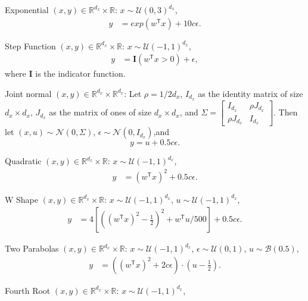 \documentclass[11pt]{article}
\newcommand{\T}{^{\ensuremath{\mathsf{T}}}}           %
\providecommand{\mb}[1]{\boldsymbol{#1}}
\providecommand{\mc}[1]{\mathcal{#1}}
\newcommand{\Real}{\mathbb{R}}
\begin{document}
\begin{compactenum}
%
%
%
%
%
%
%
%
\item Exponential $(x,y) \in \Real^{d_{x}} \times \Real$: $x \sim \mc{U}(0,3)^{d_{x}}$, 
\begin{align*}
y &=exp(w\T x)+10c\epsilon.
\end{align*}
\item Step Function $(x,y) \in \Real^{d_{x}} \times \Real$: $x \sim \mc{U}(-1,1)^{d_{x}}$, 
\begin{align*}
y &=\mb{I}(w\T x>0)+\epsilon,
\end{align*}
where $\mb{I}$ is the indicator function. 
\item Joint normal $(x,y) \in \Real^{d_{x}} \times \Real^{d_{x}}$: Let $\rho=1/2d_{x}$, $I_{d_{x}}$ as the identity matrix of size $d_{x} \times d_{x}$, $J_{d_{x}}$ as the matrix of ones of size $d_{x} \times d_{x}$, and $\Sigma = \begin{bmatrix} I_{d_{x}}&\rho J_{d_{x}}\\ \rho J_{d_{x}}&I_{d_{x}} \end{bmatrix}$. Then let $(x,u) \sim \mc{N}(0, \Sigma)$, $\epsilon \sim \mc{N}(0, I_{d_{x}})$,and $$y=u+0.5c\epsilon.$$ 
\item Quadratic $(x,y) \in \Real^{d_{x}} \times \Real$: $x \sim \mc{U}(-1,1)^{d_{x}}$,
\begin{align*}
y&=(w\T x)^2+0.5c\epsilon.
\end{align*}
\item W Shape $(x,y) \in \Real^{d_{x}} \times \Real$: $x \sim \mc{U}(-1,1)^{d_{x}}$, $u \sim \mc{U}(-1,1)^{d_{x}}$,
\begin{align*}
y&=4\left[ \left( (w\T x)^2 - \tfrac{1}{2} \right)^2 + w\T u/500 \right]+0.5c\epsilon.
\end{align*}
\item Two Parabolas $(x,y) \in \Real^{d_{x}} \times \Real$: $x \sim \mc{U}(-1,1)^{d_{x}}$, $\epsilon \sim \mc{U}(0,1)$, $u \sim \mc{B}(0.5)$,
\begin{align*}
y&=\left( (w\T x)^2  + 2c\epsilon\right) \cdot (u-\tfrac{1}{2}).
\end{align*}
\item Fourth Root $(x,y) \in \Real^{d_{x}} \times \Real$: $x \sim \mc{U}(-1,1)^{d_{x}}$,

\end{compactenum}
\end{document}
